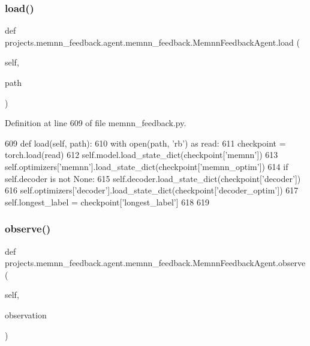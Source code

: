 \subsubsection{\texorpdfstring{load()}{load()}}
{\footnotesize\ttfamily def projects.\+memnn\+\_\+feedback.\+agent.\+memnn\+\_\+feedback.\+Memnn\+Feedback\+Agent.\+load (\begin{DoxyParamCaption}\item[{}]{self,  }\item[{}]{path }\end{DoxyParamCaption})}



Definition at line 609 of file memnn\+\_\+feedback.\+py.


\begin{DoxyCode}
609     \textcolor{keyword}{def }load(self, path):
610         with open(path, \textcolor{stringliteral}{'rb'}) \textcolor{keyword}{as} read:
611             checkpoint = torch.load(read)
612         self.model.load\_state\_dict(checkpoint[\textcolor{stringliteral}{'memnn'}])
613         self.optimizers[\textcolor{stringliteral}{'memnn'}].load\_state\_dict(checkpoint[\textcolor{stringliteral}{'memnn\_optim'}])
614         \textcolor{keywordflow}{if} self.decoder \textcolor{keywordflow}{is} \textcolor{keywordflow}{not} \textcolor{keywordtype}{None}:
615             self.decoder.load\_state\_dict(checkpoint[\textcolor{stringliteral}{'decoder'}])
616             self.optimizers[\textcolor{stringliteral}{'decoder'}].load\_state\_dict(checkpoint[\textcolor{stringliteral}{'decoder\_optim'}])
617             self.longest\_label = checkpoint[\textcolor{stringliteral}{'longest\_label'}]
618 
619 
\end{DoxyCode}
\mbox{\label{classprojects_1_1memnn__feedback_1_1agent_1_1memnn__feedback_1_1MemnnFeedbackAgent_a2913695371d86863bcbc948505c3182f}} 
\subsubsection{\texorpdfstring{observe()}{observe()}}
{\footnotesize\ttfamily def projects.\+memnn\+\_\+feedback.\+agent.\+memnn\+\_\+feedback.\+Memnn\+Feedback\+Agent.\+observe (\begin{DoxyParamCaption}\item[{}]{self,  }\item[{}]{observation }\end{DoxyParamCaption})}



